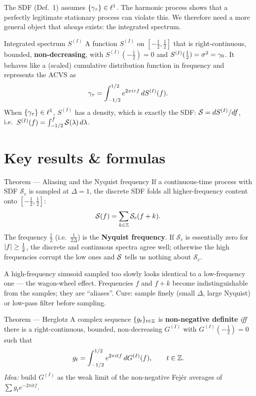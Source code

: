 \documentclass[11pt]{article}
\begin{document}
\begin{intu}
The SDF (Def.~1) assumes $\{\gamma_\tau\}\in\ell^1$. The harmonic process shows that a perfectly legitimate stationary process can violate this. We therefore need a more general object that \emph{always} exists: the integrated spectrum.
\end{intu}

\begin{defn}{Integrated spectrum $S^{(I)}$}
A function $S^{(I)}$ on $[-\tfrac12,\tfrac12]$ that is right-continuous, bounded, \textbf{non-decreasing}, with $S^{(I)}(-\tfrac12)=0$ and $S^{(I)}(\tfrac12)=\sigma^2=\gamma_0$. It behaves like a (scaled) cumulative distribution function in frequency and represents the ACVS as
\[
\gamma_\tau=\int_{-1/2}^{1/2} e^{2\pi i\tau f}\,dS^{(I)}(f).
\]
When $\{\gamma_\tau\}\in\ell^1$, $S^{(I)}$ has a density, which is exactly the SDF: $\mathcal{S}=dS^{(I)}/df$, i.e.\ $S^{(I)}(f)=\int_{-1/2}^{f}\mathcal{S}(\lambda)\,d\lambda$.
\end{defn}

\section*{Key results \& formulas}

\begin{result}{Theorem --- Aliasing and the Nyquist frequency}
If a continuous-time process with SDF $\mathcal{S}_c$ is sampled at $\Delta=1$, the discrete SDF folds all higher-frequency content onto $[-\tfrac12,\tfrac12]$:
\[
\mathcal{S}(f)=\sum_{k\in\mathbb{Z}}\mathcal{S}_c(f+k).
\]
The frequency $\tfrac12$ (i.e.\ $\tfrac1{2\Delta}$) is the \textbf{Nyquist frequency}. If $\mathcal{S}_c$ is essentially zero for $\left\lvert f \right\rvert\ge\tfrac12$, the discrete and continuous spectra agree well; otherwise the high frequencies corrupt the low ones and $\mathcal{S}$ tells us nothing about $\mathcal{S}_c$.
\end{result}

\begin{intu}
A high-frequency sinusoid sampled too slowly looks identical to a low-frequency one --- the wagon-wheel effect. Frequencies $f$ and $f+k$ become indistinguishable from the samples; they are ``aliases''. Cure: sample finely (small $\Delta$, large Nyquist) or low-pass filter before sampling.
\end{intu}

\begin{result}{Theorem --- Herglotz}
A complex sequence $\{g_t\}_{t\in\mathbb{Z}}$ is \textbf{non-negative definite} \emph{iff} there is a right-continuous, bounded, non-decreasing $G^{(I)}$ with $G^{(I)}(-\tfrac12)=0$ such that
\[
g_t=\int_{-1/2}^{1/2} e^{2\pi i t f}\,dG^{(I)}(f),\qquad t\in\mathbb{Z} .
\]
\textit{Idea:} build $G^{(I)}$ as the weak limit of the non-negative Fej\'er averages of $\sum g_t e^{-2\pi i tf}$.
\end{result}
\end{document}

